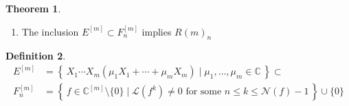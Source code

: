 \documentclass[a4paper]{article}
\theoremstyle{definition}
\newtheorem{definition}{Definition}[]
\newtheorem{theorem}[definition]{Theorem}
\newcommand{\makeset}[2]{\left\{\, #1 \mid #2 \,\right\}}
\begin{document}
\begin{theorem}
    \begin{enumerate}
        \item The inclusion \(E^{[m]} \subset F_n^{[m]}\) implies \(R(m)_n\)
    \end{enumerate}
\end{theorem}

\begin{definition}
    \begin{align*}
        E^{[m]} & = \makeset{X_1 \cdots X_m (\mu_1 X_1 + \cdots + \mu_m X_m)}{\mu_1, \ldots, \mu_m \in \mathbb{C}} \subset \\
        F^{[m]}_n &= \makeset{f \in \mathbb{C}^{[m]} \setminus \{0\}}{\mathcal{L}(f^k) \neq 0 \text{ for some } n \leq k \leq \mathcal{N}(f) - 1} \cup \{0\}
    \end{align*}
\end{definition}
\end{document}
